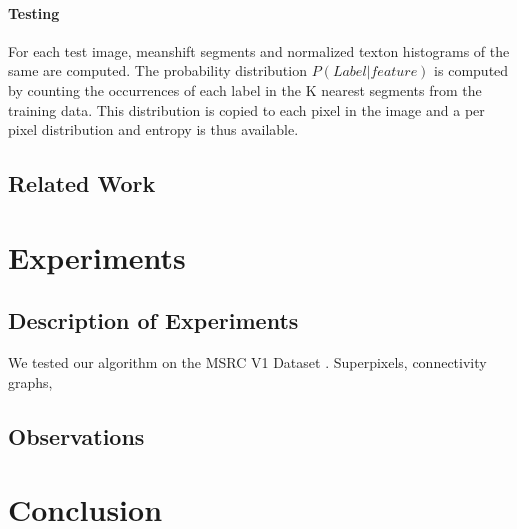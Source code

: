 \documentclass{article} %
\begin{document}
\paragraph{Testing} For each test image, meanshift segments and normalized
texton histograms of the same are computed.
The probability distribution $P(Label | feature)$ is computed by counting
the occurrences of each label in the K nearest segments from the training
data.
This distribution is copied to each pixel in the image and a per pixel
distribution and entropy is thus available.
\subsection{Related Work}
\label{sec:Related}




\section{Experiments}
\label{sec:Exp}


\subsection{Description of Experiments}
\label{sec:Description}

We tested our algorithm on the MSRC V1 Dataset \cite{MSRC}. Superpixels, connectivity graphs, 
\subsection{Observations}
\label{sec:Observations}


\section{Conclusion}
\label{sec:Conclusion}



\end{document}
